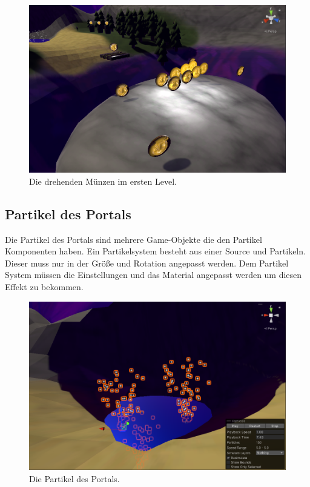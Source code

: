 \begin{figure}[H]
  \centering
  \includegraphics[width=0.5\linewidth]{chapters/14/Images/Animation.png}
  \caption{Die drehenden Münzen im ersten Level.}
  \label{U06}
\end{figure}

\subsection{Partikel des Portals}

Die Partikel des Portals sind mehrere Game-Objekte die den Partikel Komponenten haben. Ein Partikelsystem besteht aus einer Source und Partikeln. Dieser muss nur in der Größe und Rotation angepasst werden. Dem Partikel System müssen die Einstellungen und das Material angepasst werden um diesen Effekt zu bekommen.

\begin{figure}[H]
  \centering
  \includegraphics[width=0.5\linewidth]{chapters/14/Images/Partikel.png}
  \caption{Die Partikel des Portals.}
  \label{U07}
\end{figure}
